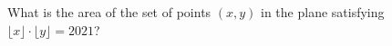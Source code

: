 What is the area of the set of points $(x,y)$ in the plane satisfying $\lfloor x\rfloor\cdot\lfloor y\rfloor=2021$?
